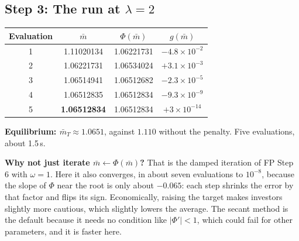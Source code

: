 \documentclass[11pt]{article}
\newcommand{\mb}{\bar m}
\begin{document}
\subsection*{Step 3: The run at \texorpdfstring{$\lambda=2$}{lambda = 2}}
\begin{center}
\small
\begin{tabular}{@{}cccc@{}}
\toprule
Evaluation & $\mb$ & $\Phi(\mb)$ & $g(\mb)$ \\
\midrule
1 & 1.11020134 & 1.06221731 & $-4.8\times10^{-2}$ \\
2 & 1.06221731 & 1.06534024 & $+3.1\times10^{-3}$ \\
3 & 1.06514941 & 1.06512682 & $-2.3\times10^{-5}$ \\
4 & 1.06512835 & 1.06512834 & $-9.3\times10^{-9}$ \\
5 & \textbf{1.06512834} & 1.06512834 & $+3\times10^{-14}$ \\
\bottomrule
\end{tabular}
\end{center}
\textbf{Equilibrium: $\mb_T\approx1.0651$}, against $1.110$ without the penalty. Five
evaluations, about 1.5\,s.

\textbf{Why not just iterate $\mb\leftarrow\Phi(\mb)$?} That is the damped iteration of FP
Step 6 with $\omega=1$. Here it also converges, in about seven evaluations to $10^{-8}$, because
the slope of $\Phi$ near the root is only about $-0.065$: each step shrinks the error by that
factor and flips its sign. Economically, raising the target makes investors slightly more
cautious, which slightly lowers the average. The secant method is the default because it needs
no condition like $|\Phi'|<1$, which could fail for other parameters, and it is faster here.
\end{document}
